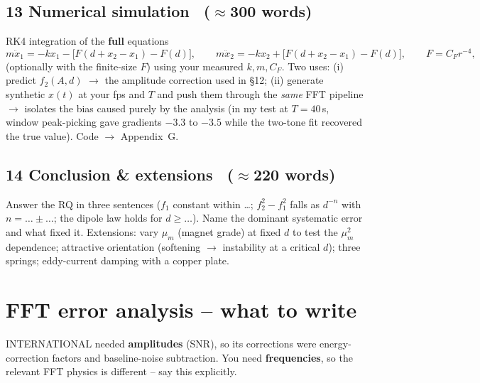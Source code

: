\documentclass[11pt,a4paper]{article}
\newcommand{\mum}{\mu_m}
\newcommand{\words}[1]{~{\small\color{gray}($\approx$#1 words)}}
\begin{document}
\subsection*{13 Numerical simulation \words{300}}
RK4 integration of the \textbf{full} equations
\begin{equation}
  m\ddot x_1=-kx_1-\big[F(d+x_2-x_1)-F(d)\big],\qquad
  m\ddot x_2=-kx_2+\big[F(d+x_2-x_1)-F(d)\big],\qquad F=C_F r^{-4},
\end{equation}
(optionally with the finite-size $F$) using your measured $k,m,C_F$. Two uses:
(i) predict $f_2(A,d)$ $\to$ the amplitude correction used in \S12;
(ii) generate synthetic $x(t)$ at your fps and $T$ and push them through the \emph{same}
FFT pipeline $\to$ isolates the bias caused purely by the analysis (in my test at
$T=40$\,s, window peak-picking gave gradients $-3.3$ to $-3.5$ while the two-tone fit
recovered the true value). Code $\to$ Appendix~G.

\subsection*{14 Conclusion \& extensions \words{220}}
Answer the RQ in three sentences ($f_1$ constant within \ldots; $f_2^2-f_1^2$ falls as
$d^{-n}$ with $n=\ldots\pm\ldots$; the dipole law holds for $d\ge\ldots$). Name the
dominant systematic error and what fixed it. Extensions: vary $\mum$ (magnet grade) at
fixed $d$ to test the $\mum^2$ dependence; attractive orientation (softening $\to$
instability at a critical $d$); three springs; eddy-current damping with a copper plate.

\section{FFT error analysis -- what to write}\label{sec:fft}

INTERNATIONAL needed \textbf{amplitudes} (SNR), so its corrections were energy-correction
factors and baseline-noise subtraction. You need \textbf{frequencies}, so the relevant FFT
physics is different -- say this explicitly.
\end{document}
